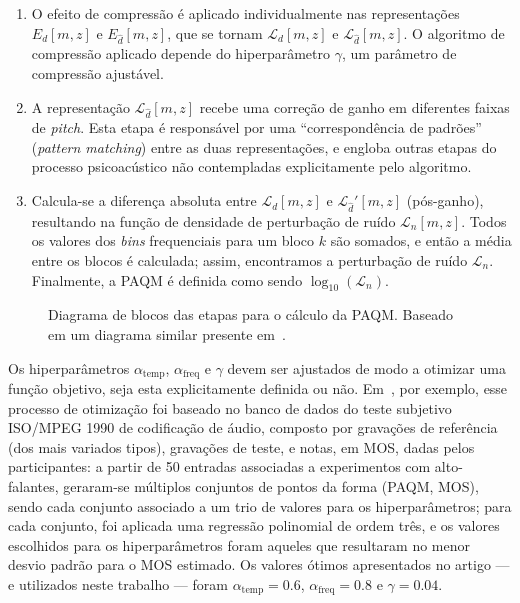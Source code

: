 \begin{enumerate}
    \item O efeito de compressão é aplicado individualmente nas representações $E_d[m, z]$ e $E_{\hat{d}}[m, z]$, que se tornam $\mathcal{L}_d[m, z]$ e $\mathcal{L}_{\hat{d}}[m, z]$. O algoritmo de compressão aplicado depende do hiperparâmetro $\gamma$, um parâmetro de compressão ajustável.
    
    \item A representação $\mathcal{L}_{\hat{d}}[m, z]$ recebe uma correção de ganho em diferentes faixas de \textit{pitch}. Esta etapa é responsável por uma ``correspondência de padrões'' (\textit{pattern matching}) entre as duas representações, e engloba outras etapas do processo psicoacústico não contempladas explicitamente pelo algoritmo. 

    \item Calcula-se a diferença absoluta entre $\mathcal{L}_d[m, z]$ e $\mathcal{L}_{\hat{d}}'[m, z]$ (pós-ganho), resultando na função de densidade de perturbação de ruído $\mathcal{L}_n[m, z]$. Todos os valores dos \textit{bins} frequenciais para um bloco $k$ são somados, e então a média entre os blocos é calculada; assim, encontramos a perturbação de ruído $\mathcal{L}_n$. Finalmente, a PAQM é definida como sendo $\log_{10}(\mathcal{L}_n)$.
\end{enumerate}

\begin{figure}[hbtp]
    \centering
    
    \caption[Diagrama de blocos da PAQM]{Diagrama de blocos das etapas para o cálculo da PAQM. Baseado em um diagrama similar presente em~\cite{beerends-2002}.}
    \label{fig:metricas:paqm-diagram}
\end{figure}

Os hiperparâmetros $\alpha_{\text{temp}}$, $\alpha_{\text{freq}}$ e $\gamma$ devem ser ajustados de modo a otimizar uma função objetivo, seja esta explicitamente definida ou não. Em~\cite{beerends-2002}, por exemplo, esse processo de otimização foi baseado no banco de dados do teste subjetivo ISO/MPEG 1990 de codificação de áudio, composto por gravações de referência (dos mais variados tipos), gravações de teste, e notas, em MOS, dadas pelos participantes: a partir de 50 entradas associadas a experimentos com alto-falantes, geraram-se múltiplos conjuntos de pontos da forma (PAQM, MOS), sendo cada conjunto associado a um trio de valores para os hiperparâmetros; para cada conjunto, foi aplicada uma regressão polinomial de ordem três, e os valores escolhidos para os hiperparâmetros foram aqueles que resultaram no menor desvio padrão para o MOS estimado. Os valores ótimos apresentados no artigo --- e utilizados neste trabalho --- foram $\alpha_{\text{temp}} = 0.6$, $\alpha_{\text{freq}} = 0.8$ e $\gamma = 0.04$.

